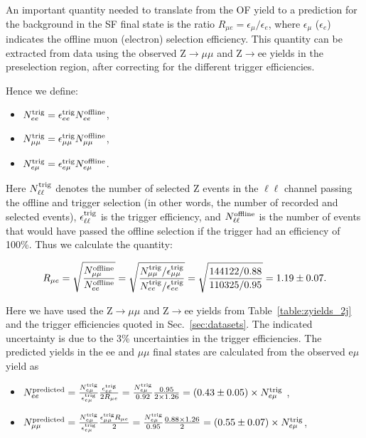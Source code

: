 An important quantity needed to translate from the OF yield to a prediction for the background in the SF final state is the ratio 
$R_{\mu e} = \epsilon_\mu / \epsilon_e$, where $\epsilon_\mu$ ($\epsilon_e$) indicates the offline muon (electron) selection efficiency. 
This quantity can be extracted from data using the observed Z$\to\mu\mu$ and Z$\to$ee yields in the preselection region, after correcting 
for the different trigger efficiencies.

Hence we define:

\begin{itemize}
\item $N_{ee}^{\rm{trig}} = \epsilon_{ee}^{\rm{trig}}N_{ee}^{\rm{offline}}$,
\item $N_{\mu\mu}^{\rm{trig}} = \epsilon_{\mu\mu}^{\rm{trig}}N_{\mu\mu}^{\rm{offline}}$,
\item $N_{e\mu}^{\rm{trig}} = \epsilon_{e\mu}^{\rm{trig}}N_{e\mu}^{\rm{offline}}$.
\end{itemize}
 
Here $N_{\ell\ell}^{\rm{trig}}$ denotes the number of selected Z events in the $\ell\ell$ channel passing the offline and trigger selection
(in other words, the number of recorded and selected events), $\epsilon_{\ell\ell}^{\rm{trig}}$ is the trigger efficiency, and 
$N_{\ell\ell}^{\rm{offline}}$ is the number of events that would have passed the offline selection if the trigger had an efficiency of 100\%.
Thus we calculate the quantity:

\begin{equation}
R_{\mu e} = \sqrt{\frac{N_{\mu\mu}^{\rm{offline}}}{N_{ee}^{\rm{offline}}}} = \sqrt{\frac{N_{\mu\mu}^{\rm{trig}}/\epsilon_{\mu\mu}^{\rm{trig}}}{N_{ee}^{\rm{trig}}/\epsilon_{ee}^{\rm{trig}}}} 
= \sqrt{\frac{144122/0.88}{110325/0.95}} = 1.19\pm0.07.
\end{equation}

Here we have used the Z$\to\mu\mu$ and Z$\to$ee yields from Table~\ref{table:zyields_2j} and the trigger efficiencies quoted in Sec.~\ref{sec:datasets}.
The indicated uncertainty is due to the 3\% uncertainties in the trigger efficiencies. %
The predicted yields in the ee and $\mu\mu$ final states are calculated from the observed e$\mu$ yield as

\begin{itemize}
\item $N_{ee}^{\rm{predicted}}    = \frac {N_{e\mu}^{\rm{trig}}} {\epsilon_{e\mu}^{\rm{trig}}} \frac {\epsilon_{ee}^{\rm{trig}}} {2 R_{\mu e}} 
= \frac{N_{e\mu}^{\rm{trig}}}{0.92}\frac{0.95}{2\times1.26} = (0.43\pm0.05) \times N_{e\mu}^{\rm{trig}}$ ,
\item $N_{\mu\mu}^{\rm{predicted}} = \frac {N_{e\mu}^{\rm{trig}}} {\epsilon_{e\mu}^{\rm{trig}}} \frac {\epsilon_{\mu\mu}^{\rm{trig}} R_{\mu e}}  {2}
= \frac {N_{e\mu}^{\rm{trig}}} {0.95} \frac {0.88 \times 1.26}{2} = (0.55\pm0.07) \times N_{e\mu}^{\rm{trig}}$,
\end{itemize}


